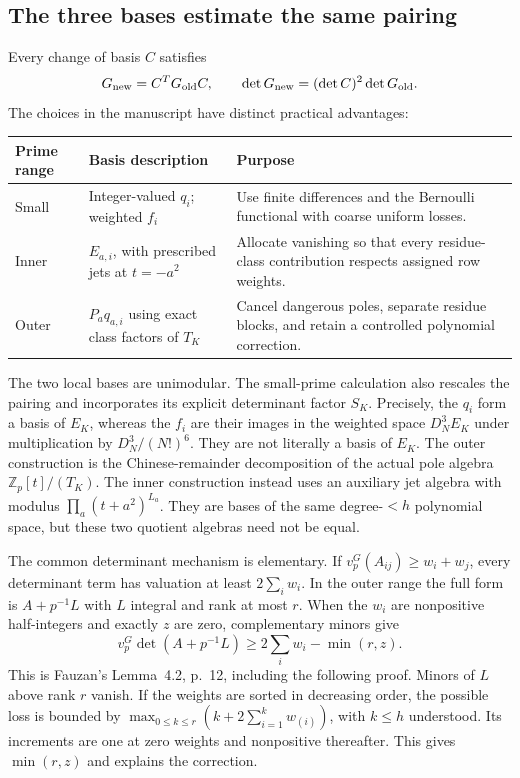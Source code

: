 \documentclass[11pt]{article}
\theoremstyle{definition}
\theoremstyle{remark}\newtheorem*{remark}{Remark}
\newcommand{\Z}{\mathbb Z}
\begin{document}
\subsection{The three bases estimate the same pairing}
Every change of basis $C$ satisfies
\begin{equation}\label{eq:congruence}
 G_{\rm new}=C^TG_{\rm old}C,\qquad
 \det G_{\rm new}=(\det C)^2\det G_{\rm old}.
\end{equation}
The choices in the manuscript have distinct practical advantages:
\begin{center}
\begin{tabular}{>{\raggedright\arraybackslash}p{}>{\raggedright\arraybackslash}p{}>{\raggedright\arraybackslash}p{}}
\toprule
Prime range & Basis description & Purpose\\ \midrule
Small & Integer-valued $q_i$; weighted $f_i$ & Use finite differences and the
Bernoulli functional with coarse uniform losses.\\[4pt]
Inner & $E_{a,i}$, with prescribed jets at $t=-a^2$ & Allocate vanishing so that
every residue-class contribution respects assigned row weights.\\[4pt]
Outer & $P_aq_{a,i}$ using exact class factors of $T_K$ & Cancel dangerous poles,
separate residue blocks, and retain a controlled polynomial correction.\\
\bottomrule
\end{tabular}
\end{center}
The two local bases are unimodular. The small-prime calculation also rescales
the pairing and incorporates its explicit determinant factor $S_K$.
Precisely, the $q_i$ form a basis of $E_K$, whereas the $f_i$ are their images
in the weighted space $D_N^3E_K$ under multiplication by
$D_N^3/(N!)^6$. They are not literally a basis of $E_K$.
The outer construction is the Chinese-remainder decomposition of the actual
pole algebra $\Z_p[t]/(T_K)$. The inner construction instead uses an auxiliary
jet algebra with modulus $\prod_a(t+a^2)^{L_a}$. They are bases of the same
degree-$<h$ polynomial space, but these two quotient algebras need not be equal.

The common determinant mechanism is elementary. If
$v_p^G(A_{ij})\ge w_i+w_j$, every determinant term has valuation at least
$2\sum_iw_i$. In the outer range the full form is
$A+p^{-1}L$ with $L$ integral and rank at most $r$. When the $w_i$ are
nonpositive half-integers and exactly $z$ are zero, complementary minors give
\begin{equation}\label{eq:rank}
 v_p^G\det(A+p^{-1}L)\ge2\sum_iw_i-\min(r,z).
\end{equation}
This is Fauzan's Lemma~4.2, p.~12, including the following proof.
Minors of $L$ above rank $r$ vanish. If the weights are sorted in decreasing
order, the possible loss is bounded by
$\max_{0\le k\le r}(k+2\sum_{i=1}^k w_{(i)})$, with $k\le h$ understood.
Its increments are one at zero weights and nonpositive thereafter.
This gives $\min(r,z)$ and explains the correction.
\end{document}
